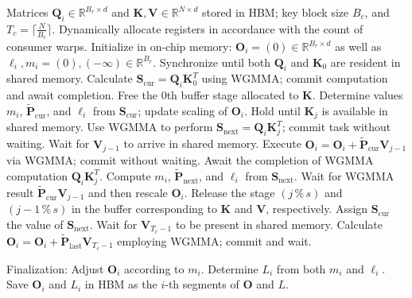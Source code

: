 \begin{algorithm}[H]
    \caption{\small\label{alg:flash3_wgmma}\textsc{FlashAttention-3} consumer warpgroup forward pass}
    \begin{algorithmic}[1]
      \REQUIRE Matrices $\mathbf{Q}_i \in \mathbb{R}^{B_r \times d}$ and $\mathbf{K}, \mathbf{V} \in \mathbb{R}^{N \times d}$ stored in HBM; key block size $B_c$, and $T_c = \lceil \frac{N}{B_c} \rceil$.
      \STATE Dynamically allocate registers in accordance with the count of consumer warps.
      \STATE Initialize in on-chip memory: $\mathbf{O}_i = (0) \in \mathbb{R}^{B_r \times d}$ as well as $\ell_i, m_i = (0), (-\infty) \in \mathbb{R}^{B_r}$.
      \STATE Synchronize until both $\mathbf{Q}_i$ and $\mathbf{K}_0$ are resident in shared memory.
      \STATE Calculate $\mathbf{S}_{\mathrm{cur}} = \mathbf{Q}_i \mathbf{K}_0^T$ using WGMMA; commit computation and await completion.
      \STATE Free the $0$th buffer stage allocated to $\mathbf{K}$.
      \STATE Determine values $m_i$, $\tilde{\mathbf{P}}_{\mathrm{cur}}$, and $\ell_i$ from $\mathbf{S}_{\mathrm{cur}}$; update scaling of $\mathbf{O}_i$.
        \STATE Hold until $\mathbf{K}_j$ is available in shared memory.
        \label{code:mainloop_start}
        \STATE Use WGMMA to perform $\mathbf{S}_{\mathrm{next}} = \mathbf{Q}_i \mathbf{K}_j^T$; commit task without waiting.
        \label{code:first_wgmma}
        \STATE Wait for $\mathbf{V}_{j-1}$ to arrive in shared memory.
        \STATE Execute $\mathbf{O}_i = \mathbf{O}_i + \tilde{\mathbf{P}}_{\mathrm{cur}} \mathbf{V}_{j-1}$ via WGMMA; commit without waiting.
        \label{code:second_wgmma}
        \STATE Await the completion of WGMMA computation $\mathbf{Q}_i \mathbf{K}_j^T$.
        \STATE Compute $m_{i}$, $\tilde{\mathbf{P}}_{\mathrm{next}}$, and $\ell_{i}$ from $\mathbf{S}_{\mathrm{next}}$.
        \label{code:softmax}
        \STATE Wait for WGMMA result $\tilde{\mathbf{P}}_{\mathrm{cur}} \mathbf{V}_{j-1}$ and then rescale $\mathbf{O}_i$.
        \STATE Release the stage $(j\,\%\,s)$ and $(j-1\,\%\,s)$ in the buffer corresponding to $\mathbf{K}$ and $\mathbf{V}$, respectively.
        \STATE Assign $\mathbf{S}_{\mathrm{cur}}$ the value of $\mathbf{S}_{\mathrm{next}}$.
        \label{code:mainloop_end}
      \ENDFOR
      \STATE Wait for $\mathbf{V}_{T_c - 1}$ to be present in shared memory.
      \STATE Calculate $\mathbf{O}_i = \mathbf{O}_i + \tilde{\mathbf{P}}_{\mathrm{last}} \mathbf{V}_{T_c - 1}$ employing WGMMA; commit and wait.

\STATE Finalization: Adjust $\mathbf{O}_{i}$ according to $m_{i}$. Determine $L_{i}$ from both $m_{i}$ and $\ell_{i}$.
Save $\mathbf{O}_{i}$ and $L_{i}$ in HBM as the $i$-th segments of $\mathbf{O}$ and $L$.


\end{algorithmic}
\end{algorithm}
